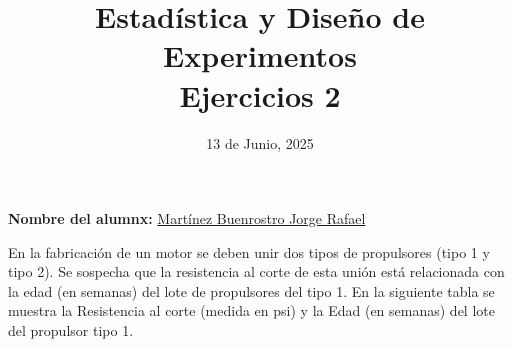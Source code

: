 \documentclass[12pt,a4paper]{article}
\title{Estadística y Diseño de Experimentos\\
Ejercicios 2}
\date{13 de Junio, 2025}
\author{}
\begin{document}
\maketitle

\noindent\textbf{Nombre del alumnx:} \underline{\hspace{0.5cm}Martínez Buenrostro Jorge Rafael\hspace{0.5cm}}

\vspace{1cm}

En la fabricaci\'on de un motor se deben unir dos tipos de propulsores (tipo 1 y tipo 2). Se sospecha que la resistencia al corte de esta uni\'on est\'a relacionada con la edad (en semanas) del lote de propulsores del tipo 1. En la siguiente tabla se muestra la Resistencia al corte (medida en psi) y la Edad (en semanas) del lote del propulsor tipo 1.
\end{document}
